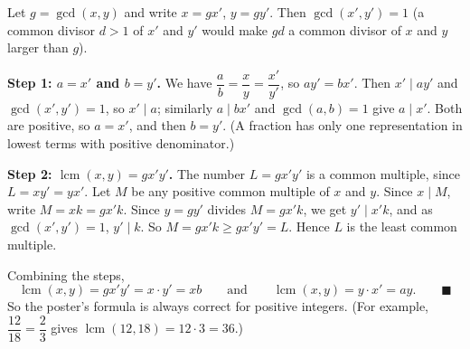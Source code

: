 Let $g=\gcd(x,y)$ and write $x=gx'$, $y=gy'$. Then $\gcd(x',y')=1$ (a common divisor $d>1$ of $x'$ and $y'$ would make $gd$ a common divisor of $x$ and $y$ larger than $g$).

\textbf{Step 1: $a=x'$ and $b=y'$.} We have $\dfrac {a}{b}=\dfrac {x}{y}=\dfrac{x'}{y'}$, so $ay'=bx'$. Then $x'\mid ay'$ and $\gcd(x',y')=1$, so $x'\mid a$; similarly $a\mid bx'$ and $\gcd(a,b)=1$ give $a\mid x'$. Both are positive, so $a=x'$, and then $b=y'$. (A fraction has only one representation in lowest terms with positive denominator.)

\textbf{Step 2: $\operatorname{lcm}(x,y)=gx'y'$.} The number $L=gx'y'$ is a common multiple, since $L=xy'=yx'$. Let $M$ be any positive common multiple of $x$ and $y$. Since $x\mid M$, write $M=xk=gx'k$. Since $y=gy'$ divides $M=gx'k$, we get $y'\mid x'k$, and as $\gcd(x',y')=1$, $y'\mid k$. So $M=gx'k\ge gx'y'=L$. Hence $L$ is the least common multiple.

Combining the steps,
\[\operatorname{lcm}(x,y)=gx'y'=x\cdot y'=xb\qquad\text{and}\qquad\operatorname{lcm}(x,y)=y\cdot x'=ay. \qquad\blacksquare\]
So the poster's formula is always correct for positive integers. (For example, $\dfrac{12}{18}=\dfrac{2}{3}$ gives $\operatorname{lcm}(12,18)=12\cdot3=36$.)
